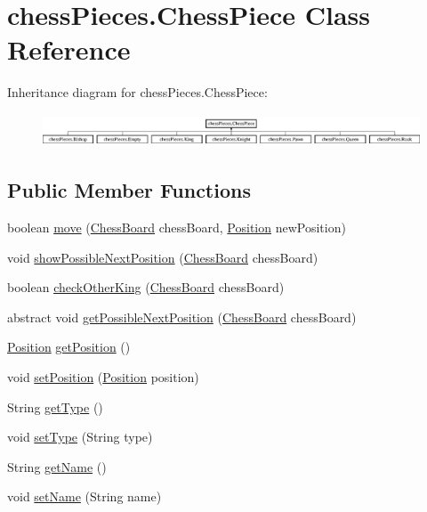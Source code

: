 \hypertarget{classchess_pieces_1_1_chess_piece}{\section{chess\+Pieces.\+Chess\+Piece Class Reference}
\label{classchess_pieces_1_1_chess_piece}
}
Inheritance diagram for chess\+Pieces.\+Chess\+Piece\+:\begin{figure}[H]
\begin{center}
\leavevmode
\includegraphics[height=0.987654cm]{classchess_pieces_1_1_chess_piece}
\end{center}
\end{figure}
\subsection*{Public Member Functions}
\begin{DoxyCompactItemize}
\item 
boolean \hyperlink{classchess_pieces_1_1_chess_piece_ac54942df9783962c97fc3df65e075a57}{move} (\hyperlink{classmodels_1_1_chess_board}{Chess\+Board} chess\+Board, \hyperlink{classmodels_1_1_position}{Position} new\+Position)
\item 
void \hyperlink{classchess_pieces_1_1_chess_piece_a28c442bb8fb5c8481f5ba76da5a9b95b}{show\+Possible\+Next\+Position} (\hyperlink{classmodels_1_1_chess_board}{Chess\+Board} chess\+Board)
\item 
boolean \hyperlink{classchess_pieces_1_1_chess_piece_a30832f783f609eac27f3ade1e70a67d3}{check\+Other\+King} (\hyperlink{classmodels_1_1_chess_board}{Chess\+Board} chess\+Board)
\item 
abstract void \hyperlink{classchess_pieces_1_1_chess_piece_a2286de37351ba3b330e82e6184549b01}{get\+Possible\+Next\+Position} (\hyperlink{classmodels_1_1_chess_board}{Chess\+Board} chess\+Board)
\item 
\hyperlink{classmodels_1_1_position}{Position} \hyperlink{classchess_pieces_1_1_chess_piece_a4b144240cc5b1ccec0622d72342fab99}{get\+Position} ()
\item 
void \hyperlink{classchess_pieces_1_1_chess_piece_ae365e81c758786651b7cf6fe06139177}{set\+Position} (\hyperlink{classmodels_1_1_position}{Position} position)
\item 
String \hyperlink{classchess_pieces_1_1_chess_piece_ad19f7b5dd7e7918664b90c679925d733}{get\+Type} ()
\item 
void \hyperlink{classchess_pieces_1_1_chess_piece_a8ee50123a2c6efcaf6681aa37bdf57de}{set\+Type} (String type)
\item 
String \hyperlink{classchess_pieces_1_1_chess_piece_a0e86e35efbd5d56b4377f9eba8b15569}{get\+Name} ()
\item 
void \hyperlink{classchess_pieces_1_1_chess_piece_a1a4ec57ad0f35722b789cd77bbf1f689}{set\+Name} (String name)
\end{DoxyCompactItemize}
